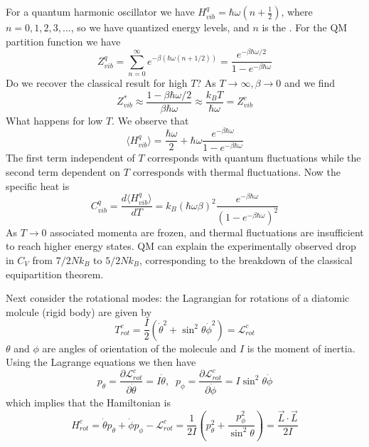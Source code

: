 \documentclass[12pt, a4paper, oneside, openright, titlepage]{book}
\begin{document}
For a quantum harmonic oscillator we have $H_{vib}^q = \hbar\omega(n+\frac{1}{2})$, where $n = 0,1,2,3,...$, so we have quantized energy levels, and $n$ is the . For the QM partition function we have \begin{equation*}
    Z_{vib}^q = \sum_{n=0}^{\infty}e^{-\beta(\hbar \omega(n+1/2))} = \frac{e^{-\beta \hbar \omega/2}}{1-e^{-\beta\hbar\omega}}
\end{equation*}
Do we recover the classical result for high $T$? As $T\rightarrow \infty,\beta\rightarrow 0$ and we find \begin{equation*}
    Z_{vib}^* \approx \frac{1-\beta \hbar\omega/2}{\beta\hbar\omega} \approx \frac{k_BT}{\hbar\omega} = Z_{vib}^c
\end{equation*}
What happens for low $T$. We observe that \begin{equation*}
    \langle H_{vib}^q\rangle = \frac{\hbar\omega}{2}+\hbar\omega\frac{e^{-\beta\hbar\omega}}{1-e^{-\beta\hbar\omega}}
\end{equation*}
The first term independent of $T$ corresponds with quantum fluctuations while the second term dependent on $T$ corresponds with thermal fluctuations. Now the specific heat is \begin{equation*}
    C_{vib}^q=\frac{d\langle H_{vib}^q\rangle}{dT} = k_B(\hbar\omega\beta)^2\frac{e^{-\beta\hbar\omega}}{(1-e^{-\beta\hbar\omega})^2}
\end{equation*}
As $T\rightarrow 0$ associated momenta are frozen, and thermal fluctuations are insufficient to reach higher energy states. QM can explain the experimentally observed drop in $C_V$ from $7/2Nk_B$ to $5/2Nk_B$, corresponding to the breakdown of the classical equipartition theorem.

Next consider the rotational modes: the Lagrangian for rotations of a diatomic molcule (rigid body) are given by \begin{equation*}
    T_{rot}^c = \frac{I}{2}\left(\dot{\theta}^2+\sin^2\theta\dot{\phi}^2\right) = \mathcal{L}_{rot}^c
\end{equation*}
$\theta$ and $\phi$ are angles of orientation of the molecule and $I$ is the moment of inertia. Using the Lagrange equations we then have \begin{equation*}
    p_{\theta} = \frac{\partial \mathcal{L}_{rot}^c}{\partial \dot{\theta}} = I\dot{\theta},\;\;p_{\phi} = \frac{\partial \mathcal{L}_{rot}^c}{\partial \dot{\phi}} = I\sin^2\theta \dot{\phi}
\end{equation*}
which implies that the Hamiltonian is \begin{equation*}
    H_{rot}^c = \dot{\theta}p_{\theta} + \dot{\phi}p_{\phi}-\mathcal{L}_{rot}^c = \frac{1}{2I}\left(p_{\theta}^2+\frac{p_{\phi}^2}{\sin^2\theta}\right) = \frac{\vec{L}\cdot\vec{L}}{2I}
\end{equation*}
\end{document}
